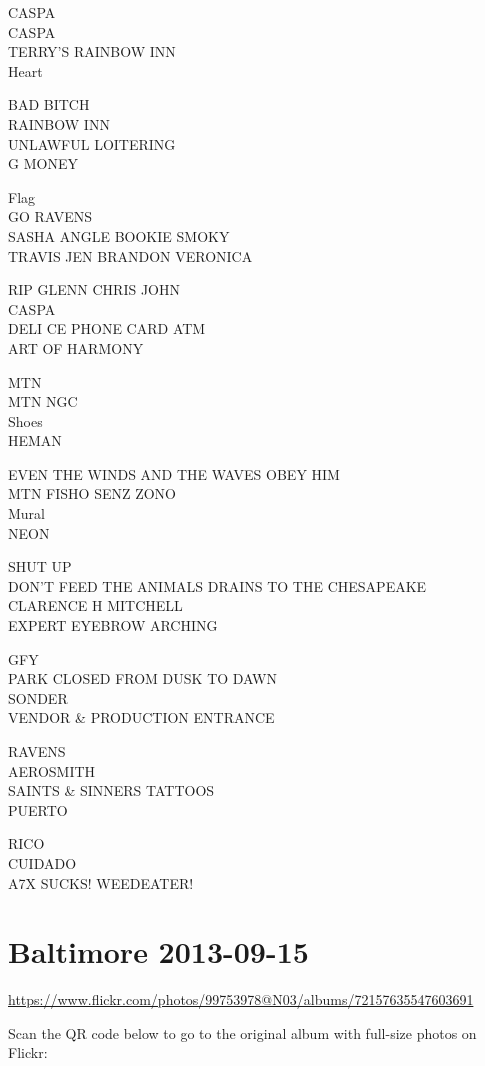 \documentclass[10pt,letterpaper]{article}
\begin{document}
CASPA\\
CASPA\\
TERRY'S RAINBOW INN\\
Heart

BAD BITCH\\
RAINBOW INN\\
UNLAWFUL LOITERING\\
G MONEY

Flag\\
GO RAVENS\\
SASHA ANGLE BOOKIE SMOKY\\
TRAVIS JEN BRANDON VERONICA

RIP GLENN CHRIS JOHN\\
CASPA\\
DELI CE PHONE CARD ATM\\
ART OF HARMONY

MTN\\
MTN NGC\\
Shoes\\
HEMAN

EVEN THE WINDS AND THE WAVES OBEY HIM\\
MTN FISHO SENZ ZONO\\
Mural\\
NEON

SHUT UP\\
DON'T FEED THE ANIMALS DRAINS TO THE CHESAPEAKE\\
CLARENCE H MITCHELL\\
EXPERT EYEBROW ARCHING

GFY\\
PARK CLOSED FROM DUSK TO DAWN\\
SONDER\\
VENDOR \& PRODUCTION ENTRANCE

RAVENS\\
AEROSMITH\\
SAINTS \& SINNERS TATTOOS\\
PUERTO

RICO\\
CUIDADO\\
A7X SUCKS!  WEEDEATER!


\section*{Baltimore 2013-09-15}

\url{https://www.flickr.com/photos/99753978@N03/albums/72157635547603691}

Scan the QR code below to go to the original album with full-size photos on Flickr:
\end{document}
